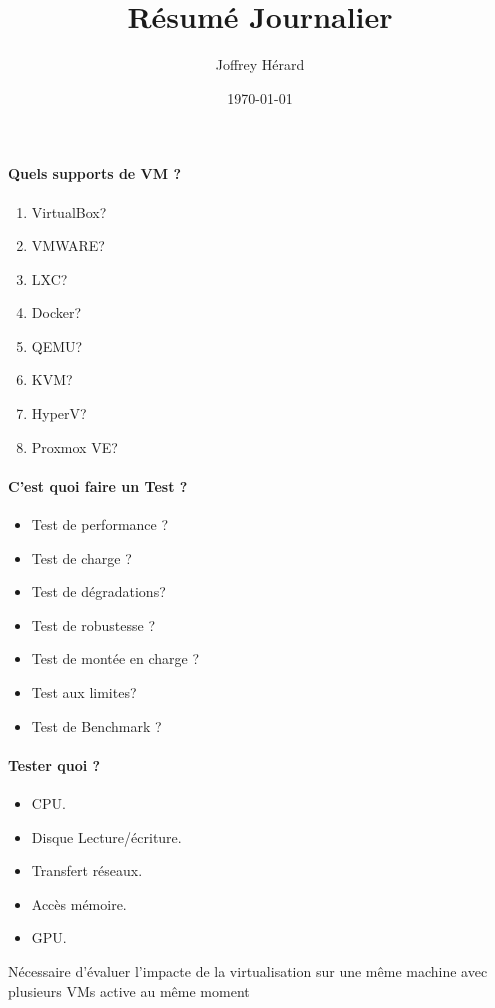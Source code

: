 \documentclass[french]{article}
\begin{document}
\title{Résumé Journalier}
\author{Joffrey Hérard}
\date{\today} 

\maketitle

\paragraph{Quels supports de VM ?}
\begin{enumerate}
	\item VirtualBox?
	\item VMWARE?
	\item LXC?
	\item Docker?
	\item QEMU?
	\item KVM?
	\item HyperV?
	\item Proxmox VE?
\end{enumerate}

\paragraph{C'est quoi faire un Test ? }
\begin{itemize}
\item Test de performance ? 
\item Test de charge ? 
\item Test de dégradations?
\item Test de robustesse ?
\item Test de montée en charge ?
\item Test aux limites?
\item Test de Benchmark ?
\end{itemize}

\paragraph{Tester quoi ?}
\begin{itemize}
	\item CPU.
	\item Disque Lecture/écriture.
	\item Transfert réseaux.
	\item Accès mémoire.
	\item GPU.  
\end{itemize}
Nécessaire d'évaluer l'impacte de la virtualisation sur une même machine avec plusieurs VMs active au même moment 
\end{document}
